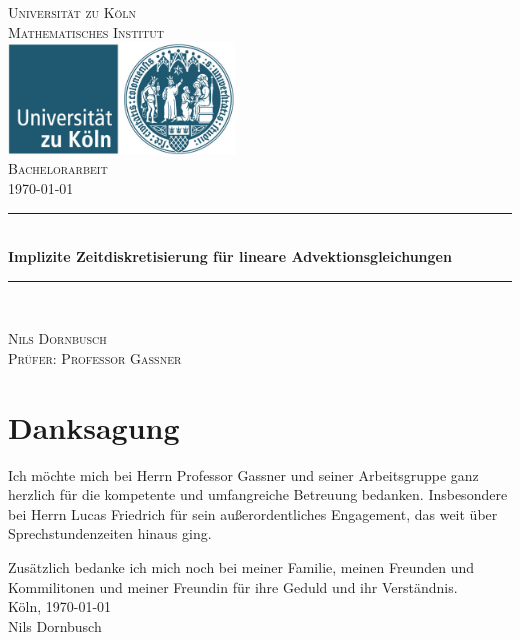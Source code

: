 \documentclass[12pt,a4paper]{scrartcl}
\numberwithin{equation}{section} %
\theoremstyle{definition}
\theoremstyle{plain}
\begin{document}
\begin{titlepage}
\pagestyle{empty}
\begin{center}

\textsc{\LARGE Universität zu Köln }\\ [0.4cm]
\textsc{ Mathematisches Institut} \\[1.5cm]

\includegraphics[width=0.45\textwidth]{uni}\\[1.5cm]  %

\textsc{\Large Bachelorarbeit}\\[2mm]
\textsc{\today}\\[10mm]
  

\newcommand{\HRule}{\rule{\linewidth}{0.7mm}}
\HRule \\[0.4cm]
{ \huge \bfseries Implizite Zeitdiskretisierung für lineare Advektionsgleichungen}\\[0.4cm]

\HRule \\[3cm]

\begin{center}

\textsc{\Large Nils Dornbusch} \\[3pt]
\textsc{\Large Prüfer: Professor Gassner}
\end{center}
\end{center}
\end{titlepage}
\section*{Danksagung}
Ich möchte mich bei Herrn Professor Gassner und seiner Arbeitsgruppe ganz herzlich für die kompetente und umfangreiche Betreuung bedanken. Insbesondere bei Herrn Lucas Friedrich für sein außerordentliches Engagement, das weit über Sprechstundenzeiten hinaus ging. 
\par Zusätzlich bedanke ich mich noch bei meiner Familie, meinen Freunden und Kommilitonen und meiner Freundin für ihre Geduld und ihr Verständnis.
\\[1cm]
Köln, \today 
\\[1cm]
Nils Dornbusch
\newpage
\tableofcontents
\newpage
\end{document}
